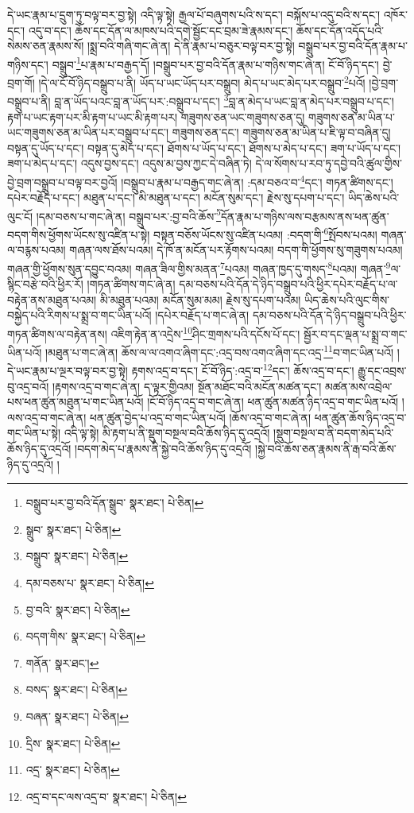 དེ་ཡང་རྣམ་པ་དྲུག་ཏུ་བལྟ་བར་བྱ་སྟེ། འདི་ལྟ་སྟེ། རྒྱལ་པོ་བཞུགས་པའི་ས་དང་། བསྐོས་པ་འདུ་བའི་ས་དང་། འཁོར་དང་། འདུ་བ་དང་། ཆོས་དང་དོན་ལ་མཁས་པའི་དགེ་སྦྱོང་དང་བྲམ་ཟེ་རྣམས་དང་། ཆོས་དང་དོན་འདོད་པའི་སེམས་ཅན་རྣམས་སོ། །སྨྲ་བའི་གཞི་གང་ཞེ་ན། དེ་ནི་རྣམ་པ་བཅུར་བལྟ་བར་བྱ་སྟེ། བསྒྲུབ་པར་བྱ་བའི་དོན་རྣམ་པ་གཉིས་དང་། བསྒྲུབ་\footnote{བསྒྲུབ་པར་བྱ་བའི་དོན་སྒྲུབ་  སྣར་ཐང་།  པེ་ཅིན། }པ་རྣམ་པ་བརྒྱད་དོ། །བསྒྲུབ་པར་བྱ་བའི་དོན་རྣམ་པ་གཉིས་གང་ཞེ་ན། ངོ་བོ་ཉིད་དང་། བྱེ་བྲག་གོ། །དེ་ལ་ངོ་བོ་ཉིད་བསྒྲུབ་པ་ནི། ཡོད་པ་ཡང་ཡོད་པར་བསྒྲུབ། མེད་པ་ཡང་མེད་པར་བསྒྲུབ་\footnote{སྒྲུབ་  སྣར་ཐང་།  པེ་ཅིན། }པའོ། །བྱེ་བྲག་བསྒྲུབ་པ་ནི། བླ་ན་ཡོད་པའང་བླ་ན་ཡོད་པར་:བསྒྲུབ་པ་དང་། \footnote{བསྒྲུབ་  སྣར་ཐང་།  པེ་ཅིན། }བླ་ན་མེད་པ་ཡང་བླ་ན་མེད་པར་བསྒྲུབ་པ་དང་། རྟག་པ་ཡང་རྟག་པར་མི་རྟག་པ་ཡང་མི་རྟག་པར། གཟུགས་ཅན་ཡང་གཟུགས་ཅན་དུ། གཟུགས་ཅན་མ་ཡིན་པ་ཡང་གཟུགས་ཅན་མ་ཡིན་པར་བསྒྲུབ་པ་དང་། གཟུགས་ཅན་དང་། གཟུགས་ཅན་མ་ཡིན་པ་ཇི་ལྟ་བ་བཞིན་དུ། བསྟན་དུ་ཡོད་པ་དང་། བསྟན་དུ་མེད་པ་དང་། ཐོགས་པ་ཡོད་པ་དང་། ཐོགས་པ་མེད་པ་དང་། ཟག་པ་ཡོད་པ་དང་། ཟག་པ་མེད་པ་དང་། འདུས་བྱས་དང་། འདུས་མ་བྱས་ཀྱང་དེ་བཞིན་ཏེ། དེ་ལ་སོགས་པ་རབ་ཏུ་དབྱེ་བའི་ཚུལ་གྱིས་བྱེ་བྲག་བསྒྲུབ་པ་བལྟ་བར་བྱའོ། །བསྒྲུབ་པ་རྣམ་པ་བརྒྱད་གང་ཞེ་ན། :དམ་བཅའ་བ་\footnote{དམ་བཅས་པ་  སྣར་ཐང་།  པེ་ཅིན། }དང་། གཏན་ཚིགས་དང་། དཔེར་བརྗོད་པ་དང་། མཐུན་པ་དང་། མི་མཐུན་པ་དང་། མངོན་སུམ་དང་། རྗེས་སུ་དཔག་པ་དང་། ཡིད་ཆེས་པའི་ལུང་ངོ། །དམ་བཅས་པ་གང་ཞེ་ན། བསྒྲུབ་པར་:བྱ་བའི་ཆོས་\footnote{བྱ་བའི་  སྣར་ཐང་།  པེ་ཅིན། }དོན་རྣམ་པ་གཉིས་ལས་བརྩམས་ནས་ཕན་ཚུན་བདག་གིས་ཕྱོགས་ཡོངས་སུ་འཛིན་པ་སྟེ། བསྟན་བཅོས་ཡོངས་སུ་འཛིན་པའམ། :བདག་གི་\footnote{བདག་གིས་  སྣར་ཐང་།  པེ་ཅིན། }སྤོབས་པའམ། གཞན་ལ་བརྙས་པའམ། གཞན་ལས་ཐོས་པའམ། དེ་ཁོ་ན་མངོན་པར་རྟོགས་པའམ། བདག་གི་ཕྱོགས་སུ་གཟུགས་པའམ། གཞན་གྱི་ཕྱོགས་སུན་དབྱུང་བའམ། གཞན་ཟིལ་གྱིས་མནན་\footnote{གནོན་  སྣར་ཐང་། }པའམ། གཞན་ཁྱད་དུ་གསད་\footnote{བསད་  སྣར་ཐང་།  པེ་ཅིན། }པའམ། གཞན་\footnote{བཞན་  སྣར་ཐང་།  པེ་ཅིན། }ལ་སྙིང་བརྩེ་བའི་ཕྱིར་རོ། །གཏན་ཚིགས་གང་ཞེ་ན། དམ་བཅས་པའི་དོན་དེ་ཉིད་བསྒྲུབ་པའི་ཕྱིར་དཔེར་བརྗོད་པ་ལ་བརྟེན་ནས་མཐུན་པའམ། མི་མཐུན་པའམ། མངོན་སུམ་མམ། རྗེས་སུ་དཔག་པའམ། ཡིད་ཆེས་པའི་ལུང་གིས་བསྐྱེད་པའི་རིགས་པ་སྨྲ་བ་གང་ཡིན་པའོ། །དཔེར་བརྗོད་པ་གང་ཞེ་ན། དམ་བཅས་པའི་དོན་དེ་ཉིད་བསྒྲུབ་པའི་ཕྱིར་གཏན་ཚིགས་ལ་བརྟེན་ནས། འཇིག་རྟེན་ན་འདྲེས་\footnote{དྲིས་  སྣར་ཐང་།  པེ་ཅིན། }ཤིང་གྲགས་པའི་དངོས་པོ་དང་། སྦྱོར་བ་དང་ལྡན་པ་སྨྲ་བ་གང་ཡིན་པའོ། །མཐུན་པ་གང་ཞེ་ན། ཆོས་ལ་ལ་འགའ་ཞིག་དང་:འདྲ་བས་འགའ་ཞིག་དང་འདྲ་\footnote{འདྲ་  སྣར་ཐང་།  པེ་ཅིན། }བ་གང་ཡིན་པའོ། །དེ་ཡང་རྣམ་པ་ལྔར་བལྟ་བར་བྱ་སྟེ། རྟགས་འདྲ་བ་དང་། ངོ་བོ་ཉིད་:འདྲ་བ་\footnote{འདྲ་བ་དང་ལས་འདྲ་བ་  སྣར་ཐང་།  པེ་ཅིན། }དང་། ཆོས་འདྲ་བ་དང་། རྒྱུ་དང་འབྲས་བུ་འདྲ་བའོ། །རྟགས་འདྲ་བ་གང་ཞེ་ན། ད་ལྟར་གྱིའམ། སྔོན་མཐོང་བའི་མངོན་མཚན་དང་། མཚན་མས་འབྲེལ་པས་ཕན་ཚུན་མཐུན་པ་གང་ཡིན་པའོ། །ངོ་བོ་ཉིད་འདྲ་བ་གང་ཞེ་ན། ཕན་ཚུན་མཚན་ཉིད་འདྲ་བ་གང་ཡིན་པའོ། །ལས་འདྲ་བ་གང་ཞེ་ན། ཕན་ཚུན་བྱེད་པ་འདྲ་བ་གང་ཡིན་པའོ། །ཆོས་འདྲ་བ་གང་ཞེ་ན། ཕན་ཚུན་ཆོས་ཉིད་འདྲ་བ་གང་ཡིན་པ་སྟེ། འདི་ལྟ་སྟེ། མི་རྟག་པ་ནི་སྡུག་བསྔལ་བའི་ཆོས་ཉིད་དུ་འདྲའོ། །སྡུག་བསྔལ་བ་ནི་བདག་མེད་པའི་ཆོས་ཉིད་དུ་འདྲའོ། །བདག་མེད་པ་རྣམས་ནི་སྐྱེ་བའི་ཆོས་ཉིད་དུ་འདྲའོ། །སྐྱེ་བའི་ཆོས་ཅན་རྣམས་ནི་རྒ་བའི་ཆོས་ཉིད་དུ་འདྲའོ། །
